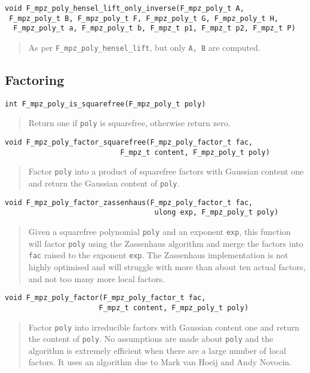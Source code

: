 \documentclass[a4paper,10pt]{article}
\newcommand{\code}{\lstinline}
\begin{document}
\begin{lstlisting}
void F_mpz_poly_hensel_lift_only_inverse(F_mpz_poly_t A, 
 F_mpz_poly_t B, F_mpz_poly_t F, F_mpz_poly_t G, F_mpz_poly_t H, 
  F_mpz_poly_t a, F_mpz_poly_t b, F_mpz_t p1, F_mpz_t p2, F_mpz_t P)
\end{lstlisting}
\begin{quote}
As per \code{F_mpz_poly_hensel_lift}, but only \code{A, B} are computed.
\end{quote}

\subsection{Factoring}

\begin{lstlisting}
int F_mpz_poly_is_squarefree(F_mpz_poly_t poly)
\end{lstlisting}
\begin{quote}
Return one if \code{poly} is squarefree, otherwise return zero.
\end{quote}

\begin{lstlisting}
void F_mpz_poly_factor_squarefree(F_mpz_poly_factor_t fac, 
                           F_mpz_t content, F_mpz_poly_t poly)
\end{lstlisting}
\begin{quote}
Factor \code{poly} into a product of squarefree factors with Gaussian content one and return the Gaussian
content of \code{poly}.
\end{quote}

\begin{lstlisting}
void F_mpz_poly_factor_zassenhaus(F_mpz_poly_factor_t fac,
                                   ulong exp, F_mpz_poly_t poly)
\end{lstlisting}
\begin{quote}
Given a squarefree polynomial \code{poly} and an exponent \code{exp}, this function will factor \code{poly}
using the Zassenhaus algorithm and merge the factors into \code{fac} raised to the exponent \code{exp}. The 
Zassenhaus implementation is not highly optimised and will struggle with more than about ten actual factors, 
and not too many more local factors.
\end{quote}

\begin{lstlisting}
void F_mpz_poly_factor(F_mpz_poly_factor_t fac, 
		              F_mpz_t content, F_mpz_poly_t poly)
\end{lstlisting}
\begin{quote}
Factor \code{poly} into irreducible factors with Gaussian content one and return the content of \code{poly}.
No assumptions are made about \code{poly} and the algorithm is extremely efficient when there are a large
number of local factors. It uses an algorithm due to Mark van Hoeij and Andy Novocin.
\end{quote}
\end{document}
